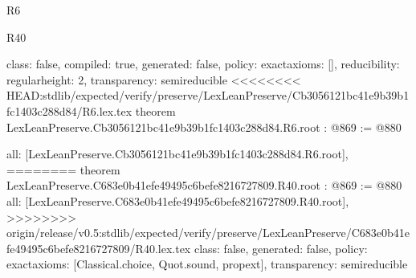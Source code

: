 \begin{lexlean}{R6}
\begin{lexlean}{R40}
\begin{coremodule}
{{{{{  class: false,
  compiled: true,
  generated: false,
  policy: exact{axioms: []},
  reducibility: regular{height: 2},
  transparency: semireducible
}
<<<<<<<< HEAD:stdlib/expected/verify/preserve/LexLeanPreserve/Cb3056121bc41e9b39b1fc1403c288d84/R6.lex.tex
theorem LexLeanPreserve.Cb3056121bc41e9b39b1fc1403c288d84.R6.root : @869 := @880 {
  all: [LexLeanPreserve.Cb3056121bc41e9b39b1fc1403c288d84.R6.root],
========
theorem LexLeanPreserve.C683e0b41efe49495c6befe8216727809.R40.root : @869 := @880 {
  all: [LexLeanPreserve.C683e0b41efe49495c6befe8216727809.R40.root],
>>>>>>>> origin/release/v0.5:stdlib/expected/verify/preserve/LexLeanPreserve/C683e0b41efe49495c6befe8216727809/R40.lex.tex
  class: false,
  generated: false,
  policy: exact{axioms: [Classical.choice, Quot.sound, propext]},
  transparency: semireducible
}

}}}}}
\end{coremodule}
\end{lexlean}
\end{lexlean}

